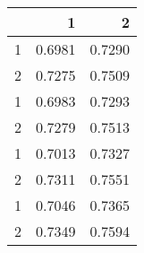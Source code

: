 \begin{tabular}{lrr}
\toprule
{} &       1 &       2 \\
\midrule
1 &  0.6981 &  0.7290 \\
2 &  0.7275 &  0.7509 \\
1 &  0.6983 &  0.7293 \\
2 &  0.7279 &  0.7513 \\
1 &  0.7013 &  0.7327 \\
2 &  0.7311 &  0.7551 \\
1 &  0.7046 &  0.7365 \\
2 &  0.7349 &  0.7594 \\
\bottomrule
\end{tabular}
